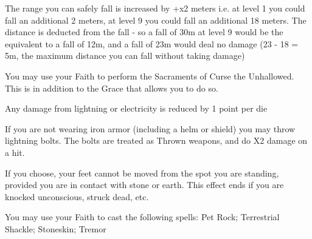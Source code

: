 {\GOD[
Name=Empress Wa,
Link=small-god-empress wa,
GodOf=God of the Heavens,
Holy=a jade diadem
]


The range you can safely fall is increased by +\LVL x2 meters i.e. at level 1 you could fall an additional 2 meters, at level 9 you could fall an additional 18 meters.  The distance is deducted from the fall - so a fall of 30m at level 9 would be the equivalent to a fall of 12m, and a fall of 23m would deal no damage (23 - 18 = 5m, the maximum distance you can fall without taking damage)


You may use your Faith to perform the Sacraments of Curse the Unhallowed.  This is in addition to the Grace that allows you to do so.




\GOD[
Name=Raiden,
Link=small-god-raiden,
GodOf=Lord of Lightning,
Holy=two iron bracers with lightning bolts etched on them
]


Any damage from lightning or electricity is reduced by 1 point per die


If you are not wearing iron armor (including a helm or shield) you may throw lightning bolts.  The bolts are treated as Thrown weapons, and do \DICE X2 damage on a hit.




\GOD[
Name=Raimonds Mountainhand,
Link=small-god-raimonds mountainhand,
GodOf=Seraph of the Mountaintops,
Holy=3 iron spikes in the shape of icicles or teeth hung from the neck
]


If you choose, your feet cannot be moved from the spot you are standing, provided you are in contact with stone or earth. This effect ends if you are knocked unconscious, struck dead, etc.


You may use your Faith to cast the following spells: Pet Rock; Terrestrial Shackle; Stoneskin; Tremor

\LITURGY [
  Name= Pet Rock,
  Link= raimonds-liturgy-pet-rock,
  Paradigm= Elements ,
  Save=  N ,
  Duration= Combat or \SUMDICE Minutes ,
  Counter=  n/a  ,
  Keywords= None ,
  Target=   Close (touch) Stone
]



}
